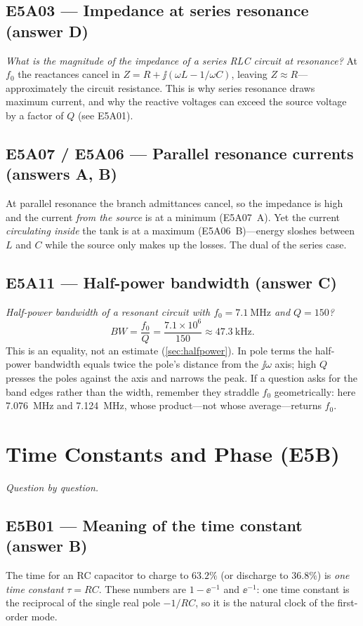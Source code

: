 \subsection*{E5A03 --- Impedance at series resonance (answer D)}
\emph{What is the magnitude of the impedance of a series RLC circuit at
resonance?} At \(f_0\) the reactances cancel in \(Z=R+\jj(\omega L-1/\omega C)\),
leaving \(Z\approx R\)---approximately the circuit resistance. This is why series
resonance draws maximum current, and why the reactive voltages can exceed the
source voltage by a factor of \(Q\) (see E5A01).

\subsection*{E5A07 / E5A06 --- Parallel resonance currents (answers A, B)}
At parallel resonance the branch admittances cancel, so the impedance is high and
the current \emph{from the source} is at a minimum (E5A07~A). Yet the current
\emph{circulating inside} the tank is at a maximum (E5A06~B)---energy sloshes
between \(L\) and \(C\) while the source only makes up the losses. The dual of the
series case.

\subsection*{E5A11 --- Half-power bandwidth (answer C)}
\emph{Half-power bandwidth of a resonant circuit with \(f_0=\SI{7.1}{\mega\hertz}\)
and \(Q=150\)?}
\[
BW=\frac{f_0}{Q}=\frac{7.1\times10^6}{150}\approx\SI{47.3}{\kilo\hertz}.
\]
This is an equality, not an estimate (\cref{sec:halfpower}). In pole terms the
half-power bandwidth equals twice the pole's distance from the \(\jj\omega\) axis;
high \(Q\) presses the poles against the axis and narrows the peak. If a question
asks for the band edges rather than the width, remember they straddle \(f_0\)
geometrically: here \SI{7.076}{\mega\hertz} and \SI{7.124}{\mega\hertz}, whose
product---not whose average---returns \(f_0\).

\section{Time Constants and Phase (E5B)}
\emph{Question by question.}

\subsection*{E5B01 --- Meaning of the time constant (answer B)}
The time for an RC capacitor to charge to \(63.2\%\) (or discharge to \(36.8\%\))
is \emph{one time constant} \(\tau=RC\). These numbers are \(1-\ee^{-1}\) and
\(\ee^{-1}\): one time constant is the reciprocal of the single real pole
\(-1/RC\), so it is the natural clock of the first-order mode.

